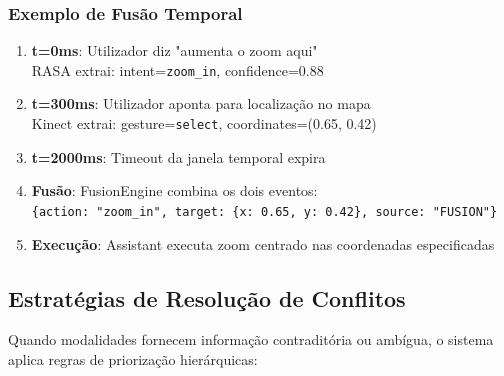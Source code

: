 \subsubsection{Exemplo de Fusão Temporal}

\begin{enumerate}
    \item \textbf{t=0ms}: Utilizador diz "aumenta o zoom aqui" \\
    RASA extrai: intent=\texttt{zoom\_in}, confidence=0.88

    \item \textbf{t=300ms}: Utilizador aponta para localização no mapa \\
    Kinect extrai: gesture=\texttt{select}, coordinates=(0.65, 0.42)

    \item \textbf{t=2000ms}: Timeout da janela temporal expira

    \item \textbf{Fusão}: FusionEngine combina os dois eventos: \\
    \texttt{\{action: "zoom\_in", target: \{x: 0.65, y: 0.42\}, source: "FUSION"\}}

    \item \textbf{Execução}: Assistant executa zoom centrado nas coordenadas especificadas
\end{enumerate}

\subsection{Estratégias de Resolução de Conflitos}

Quando modalidades fornecem informação contraditória ou ambígua, o sistema aplica regras de priorização hierárquicas:

